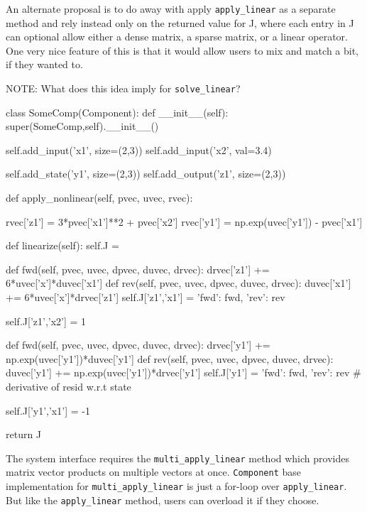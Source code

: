 \documentclass[12pt]{article}
\newcommand{\classname}[1]{\texttt{#1}}
\newcommand{\method}[1]{\texttt{#1}}
\begin{document}
An alternate proposal is to do away with apply \method{apply\_linear} as a separate method and
rely instead only on the returned value for J, where each entry in J can optional
allow either a dense matrix, a sparse matrix, or a linear operator. One very nice feature
of this is that it would allow users to mix and match a bit, if they wanted to.

NOTE: What does this idea imply for \method{solve\_linear}?

\begin{pyglist}[language=python]
    class SomeComp(Component):
        def __init__(self):
            super(SomeComp,self).__init__()

            self.add_input('x1', size=(2,3))
            self.add_input('x2', val=3.4)

            self.add_state('y1', size=(2,3))
            self.add_output('z1', size=(2,3))

        def apply_nonlinear(self, pvec, uvec, rvec):

            rvec['z1'] = 3*pvec['x1']**2 + pvec['x2']
            rvec['y1'] = np.exp(uvec['y1']) - pvec['x1']

        def linearize(self):
            self.J = {}


            def fwd(self, pvec, uvec, dpvec, duvec, drvec):
                drvec['z1'] += 6*uvec['x']*duvec['x1']
            def rev(self, pvec, uvec, dpvec, duvec, drvec):
                duvec['x1'] += 6*uvec['x']*drvec['z1']
            self.J['z1','x1'] = {'fwd': fwd, 'rev': rev}

            self.J['z1','x2'] = 1

            def fwd(self, pvec, uvec, dpvec, duvec, drvec):
                drvec['y1'] += np.exp(uvec['y1'])*duvec['y1']
            def rev(self, pvec, uvec, dpvec, duvec, drvec):
                duvec['y1'] += np.exp(uvec['y1'])*drvec['y1']
            self.J['y1'] = {'fwd': fwd, 'rev': rev} # derivative of resid w.r.t state

            self.J['y1','x1'] = -1

            return J

\end{pyglist}

The system interface requires the \method{multi\_apply\_linear}  method which provides matrix
vector products on multiple vectors at once. \classname{Component} base implementation
for \method{multi\_apply\_linear} is just a for-loop over \method{apply\_linear}. But like
the \method{apply\_linear} method, users can overload it if they choose.
\end{document}
